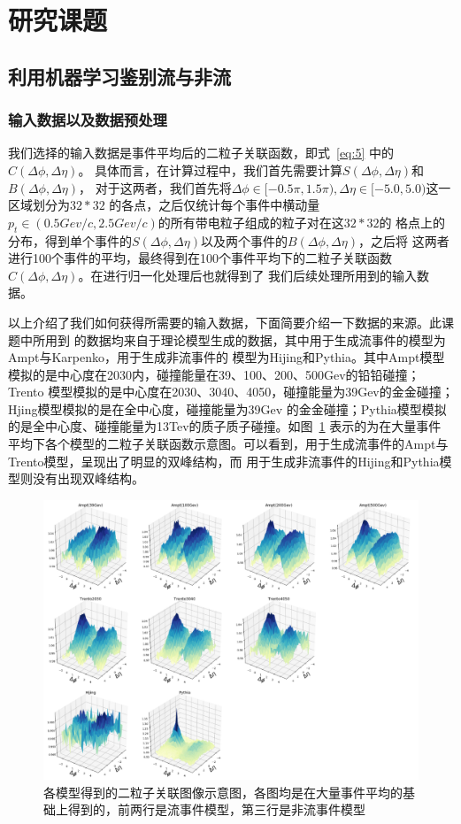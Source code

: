 \documentclass[aps,pre,12pt,preprint,onecolumn,showpacs,showkeys]{revtex4-1}
\begin{document}
\section{研究课题}
\subsection{利用机器学习鉴别流与非流}
\subsubsection{输入数据以及数据预处理}
我们选择的输入数据是事件平均后的二粒子关联函数，即式~\ref{eq:5} 中的$C(\Delta\phi,\Delta\eta)$。
具体而言，在计算过程中，我们首先需要计算$S(\Delta\phi,\Delta\eta)$和$B(\Delta\phi,\Delta\eta)$，
对于这两者，我们首先将$\Delta\phi\in[-0.5\pi,1.5\pi),\Delta\eta\in[-5.0,5.0)$这一区域划分为$32*32$
的各点，之后仅统计每个事件中横动量$p_{t}\in(0.5Gev/c,2.5Gev/c)$的所有带电粒子组成的粒子对在这$32*32$的
格点上的分布\cite{PhysRevC.89.064910}，得到单个事件的$S(\Delta\phi,\Delta\eta)$以及两个事件的$B(\Delta\phi,\Delta\eta)$，之后将
这两者进行100个事件的平均，最终得到在100个事件平均下的二粒子关联函数$C(\Delta\phi,\Delta\eta)$。在进行归一化处理后也就得到了
我们后续处理所用到的输入数据。\par
以上介绍了我们如何获得所需要的输入数据，下面简要介绍一下数据的来源。此课题中所用到
的数据均来自于理论模型生成的数据，其中用于生成流事件的模型为Ampt与Karpenko，用于生成非流事件的
模型为Hijing和Pythia。其中Ampt模型模拟\cite{PhysRevC.72.064901}的是中心度在2030内，碰撞能量在39、100、200、500Gev的铅铅碰撞；Trento
模型模拟的是中心度在2030、3040、4050，碰撞能量为39Gev的金金碰撞；Hjing模型\cite{PhysRevD.44.3501}模拟的是在全中心度，碰撞能量为39Gev
的金金碰撞；Pythia模型模拟的是全中心度、碰撞能量为13Tev的质子质子碰撞。如图~\ref{fig:sample} 表示的为在大量事件
平均下各个模型的二粒子关联函数示意图。可以看到，用于生成流事件的Ampt与Trento模型，呈现出了明显的双峰结构，而
用于生成非流事件的Hijing和Pythia模型则没有出现双峰结构。
\begin{figure}[htbp]
\centering
\includegraphics[width=140mm]{sample}
\caption{\label{fig:sample}%
各模型得到的二粒子关联图像示意图，各图均是在大量事件平均的基础上得到的，前两行是流事件模型，第三行是非流事件模型}
\end{figure}
\end{document}
